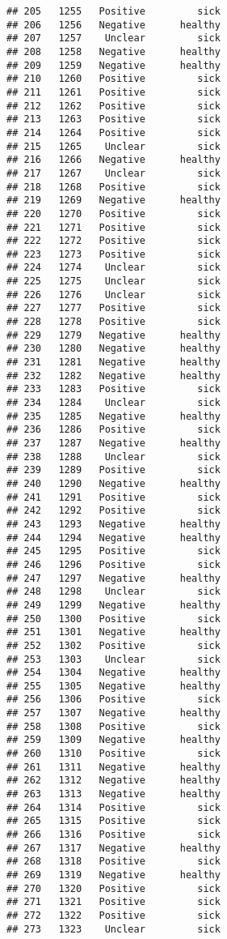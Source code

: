 \documentclass[
]{article}
\begin{document}
\begin{verbatim}
## 205   1255   Positive         sick
## 206   1256   Negative      healthy
## 207   1257    Unclear         sick
## 208   1258   Negative      healthy
## 209   1259   Negative      healthy
## 210   1260   Positive         sick
## 211   1261   Positive         sick
## 212   1262   Positive         sick
## 213   1263   Positive         sick
## 214   1264   Positive         sick
## 215   1265    Unclear         sick
## 216   1266   Negative      healthy
## 217   1267    Unclear         sick
## 218   1268   Positive         sick
## 219   1269   Negative      healthy
## 220   1270   Positive         sick
## 221   1271   Positive         sick
## 222   1272   Positive         sick
## 223   1273   Positive         sick
## 224   1274    Unclear         sick
## 225   1275    Unclear         sick
## 226   1276    Unclear         sick
## 227   1277   Positive         sick
## 228   1278   Positive         sick
## 229   1279   Negative      healthy
## 230   1280   Negative      healthy
## 231   1281   Negative      healthy
## 232   1282   Negative      healthy
## 233   1283   Positive         sick
## 234   1284    Unclear         sick
## 235   1285   Negative      healthy
## 236   1286   Positive         sick
## 237   1287   Negative      healthy
## 238   1288    Unclear         sick
## 239   1289   Positive         sick
## 240   1290   Negative      healthy
## 241   1291   Positive         sick
## 242   1292   Positive         sick
## 243   1293   Negative      healthy
## 244   1294   Negative      healthy
## 245   1295   Positive         sick
## 246   1296   Positive         sick
## 247   1297   Negative      healthy
## 248   1298    Unclear         sick
## 249   1299   Negative      healthy
## 250   1300   Positive         sick
## 251   1301   Negative      healthy
## 252   1302   Positive         sick
## 253   1303    Unclear         sick
## 254   1304   Negative      healthy
## 255   1305   Negative      healthy
## 256   1306   Positive         sick
## 257   1307   Negative      healthy
## 258   1308   Positive         sick
## 259   1309   Negative      healthy
## 260   1310   Positive         sick
## 261   1311   Negative      healthy
## 262   1312   Negative      healthy
## 263   1313   Negative      healthy
## 264   1314   Positive         sick
## 265   1315   Positive         sick
## 266   1316   Positive         sick
## 267   1317   Negative      healthy
## 268   1318   Positive         sick
## 269   1319   Negative      healthy
## 270   1320   Positive         sick
## 271   1321   Positive         sick
## 272   1322   Positive         sick
## 273   1323    Unclear         sick

\end{verbatim}
\end{document}
